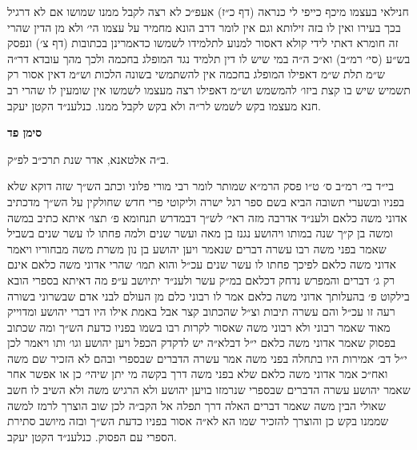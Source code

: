 \documentclass[12pt, openany]{book}
\newcommand{\chapname}{}
\newcommand{\newchap}[1]{
	\addcontentsline{toc}{chapter}{#1}
	\renewcommand{\chapname}{#1}
		\begin{center}
			\textbf{%
\fontsize{16pt}{16pt}\selectfont
				#1}
		\end{center}
}
\begin{document}
\begin{multicols}{2}
חנילאי בעצמו מיכף כייפי לי כנראה (דף כ״ז) אעפ״כ לא רצה לקבל ממנו שמושו אם לא דרגיל בכך בעירו ואין לו בזה זילותא וגם אין לומר דרב הונא מחמיר על עצמו הי׳ ולא מן הדין שהרי זה חומרא דאתי לידי קולא דאסור למנוע לתלמידו לשמשו כדאמרינן בכתובות (דף צ׳) ונפסק בש״ע (סי׳ רמ״ב) וא״כ ה״ה במי שיש לו דין תלמיד נגד המופלג בחכמה ולכך מהך עובדא דר״ה ש״מ תלת ש״מ דאפילו המופלג בחכמה אין להשתמשי בשונה הלכות וש״מ דאין אסור רק תשמיש שיש בו קצת ביזו׳ להמשמש וש״מ דאפילו רצה מעצמו לשמשו אין שומעין לו שהרי רב חנא מעצמו בקש לשמש לר״ה ולא בקש לקבל ממנו. כנלענ״ד הקטן יעקב.\\\vspace{0pt}

\end{multicols}\newpage

\newchap{סימן פד}
\begin{multicols}{2}
ב״ה אלטאנא, אדר שנת תרכ״ב לפ״ק.\\\vspace{0pt}

בי״ד בי׳ רמ״ב ס׳ ט״ו פסק הרמ״א שמותר לומר רבי מורי פלוני וכתב הש״ך שזה דוקא שלא בפניו ובשערי תשובה הביא בשם ספר רגל ישרה וליקוטי פרי חדש שחולקין על הש״ך מדכתיב אדוני משה כלאם ולענ״ד אדרבה מזה ראי׳ לש״ך דבמדרש תנחומא פ׳ תצו׳ איתא כתיב במשה ומשה בן ק״ך שנה במותו ויהושע נגנז בן מאה ועשר שנים ולמה פחתו לו עשר שנים בשביל שאמר בפני משה רבו עשרה דברים שנאמר ויען יהושע בן נון משרת משה מבחוריו ויאמר אדוני משה כלאם לפיכך פחתו לו עשר שנים עכ״ל והוא תמו׳ שהרי אדוני משה כלאם אינם רק ג׳ דברים והמפרש נדחק דכלאם במ״ק עשר ולענ״ד יתיושב ע״פ מה דאיתא בספרי הובא בילקוט פ׳ בהעלותך אדוני משה כלאם אמר לו רבוני כלם מן העולם לבני אדם שבשרוני בשורה רעה זו עכ״ל והם עשרה תיבות וצ״ל שהכתוב קצר אבל באמת אילו היו דברי יהושע ומדוייק מאוד שאמר רבוני ולא רבוני משה שאסור לקרות רבו בשמו בפניו כדעת הש״ך ומה שכתוב בפסוק שאמר אדוני משה כלאם י״ל דבלא״ה יש לדקדק הכפל ויען יהושע וגו׳ ותו ויאמר לכן י״ל דב׳ אמירות היו בתחלה בפני משה אמר עשרה הדברים שבספרי ובהם לא הזכיר שם משה ואח״כ אמר אדוני משה כלאם שלא בפני משה דרך בקשה מי יתן שיהי׳ כן או אפשר אחר שאמר יהושע עשרה הדברים שבספרי שנרמזו בויען יהושע ולא הרגיש משה ולא השיב לו חשב שאולי הבין משה שאמר דברים האלה דרך תפלה אל הקב״ה לכן שוב הוצרך לרמז למשה שממנו בקש כן והוצרך להזכיר שמו הא לא״ה אסור בפניו כדעת הש״ך ובזה מיושב סתירת הספרי עם הפסוק. כנלענ״ד הקטן יעקב.\\\vspace{0pt}

\end{multicols}\newpage
\end{document}
